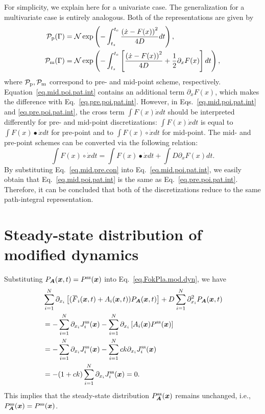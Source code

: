 \documentclass[pre,
twocolumn,
]{revtex4-1}
\newcommand{\overbar}[1]{\mkern 1.5mu\overline{\mkern-1.5mu#1\mkern-1.5mu}\mkern 1.5mu}
\theoremstyle{definition}
\theoremstyle{definition}
\newcommand{\bol}{\boldsymbol}
\newcommand{\mca}{\mathcal}
\newcommand{\eq}[1]{\begin{equation}#1\end{equation}}
\newcommand{\al}[1]{\begin{align}#1\end{align}}
\newcommand{\als}[1]{\begin{align*}#1\end{align*}}
\newcommand{\inl}[1]{$ #1 $}
\newcommand{\bras}[1]{\left[ #1 \right]}
\begin{document}
For simplicity, we explain here for a univariate case.
The generalization for a multivariate case is entirely analogous.
Both of the representations are given by
\al{
\mathcal{P}_{\rm p}(\Gamma)&=\mca{N}\exp\left(-\int_{t_s}^{t_e}\frac{\left(\dot{x}-F(x)\right)^{2}}{4D}dt\right),\label{eq.pre.poi.pat.int}\\
\mathcal{P}_{\rm m}(\Gamma)&=\mca{N}\exp\left(-\int_{t_s}^{t_e}\left[\frac{\left(\dot{x}-F(x)\right)^{2}}{4D}+\frac{1}{2}\partial_xF(x)\right]dt\right),\label{eq.mid.poi.pat.int}
}
where \inl{\mathcal{P}_{\rm p},\mathcal{P}_{\rm m}} correspond to pre- and mid-point scheme, respectively.
Equation~\eqref{eq.mid.poi.pat.int} contains an additional term \inl{\partial_xF(x)}, which makes the difference with Eq.~\eqref{eq.pre.poi.pat.int}.
However, in Eqs.~\eqref{eq.mid.poi.pat.int} and \eqref{eq.pre.poi.pat.int}, the cross term \inl{\int F(x)\dot{x}dt} should be interpreted differently for pre- and mid-point discretizations: \inl{\int F(x)\dot{x}dt} is equal to \inl{\int F(x)\bullet\dot{x}dt} for pre-point and to \inl{\int F(x)\circ\dot{x}dt} for mid-point.
The mid- and pre-point schemes can be converted via the following relation:
\eq{
\int F(x)\circ\dot{x}dt=\int F(x)\bullet\dot{x}dt+\int D\partial_xF(x)dt.\label{eq.mid.pre.con}
}
By substituting Eq.~\eqref{eq.mid.pre.con} into Eq.~\eqref{eq.mid.poi.pat.int}, we easily obtain that Eq.~\eqref{eq.mid.poi.pat.int} is the same as Eq.~\eqref{eq.pre.poi.pat.int}.
Therefore, it can be concluded that both of the discretizations reduce to the same path-integral representation.

\section{Steady-state distribution of modified dynamics}\label{app.ste.sta.mod.dyn}
Substituting \inl{P_{\bol{A}}(\bol{x},t)=P^{\rm ss}(\bol{x})} into Eq.~\eqref{eq.FokPla.mod.dyn}, we have
\als{
&\sum_{i=1}^N\partial_{x_i}\bras{(\overbar{F}_i(\bol{x},t)+A_i(\bol{x},t))P_{\bol{A}}(\bol{x},t)}+D\sum_{i=1}^N\partial_{x_i}^2P_{\bol{A}}(\bol{x},t)\\
&=-\sum_{i=1}^N\partial_{x_i}J_i^{\rm ss}(\bol{x})-\sum_{i=1}^N\partial_{x_i}\bras{A_i(\bol{x})P^{\rm ss}(\bol{x})}\\
&=-\sum_{i=1}^N\partial_{x_i}J_i^{\rm ss}(\bol{x})-\sum_{i=1}^Nck\partial_{x_i}J_i^{\rm ss}(\bol{x})\\
&=-(1+ck)\sum_{i=1}^N\partial_{x_i}J_i^{\rm ss}(\bol{x})=0.
}
This implies that the steady-state distribution \inl{P_{\bol{A}}^{\rm ss}(\bol{x})} remains unchanged, i.e., \inl{P_{\bol{A}}^{\rm ss}(\bol{x})=P^{\rm ss}(\bol{x})}.
\end{document}
